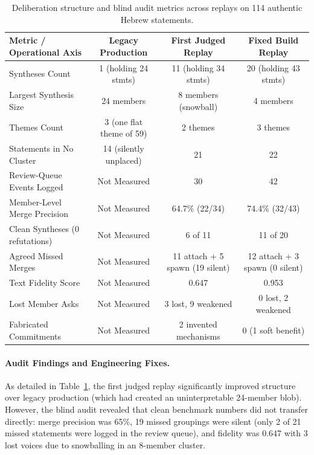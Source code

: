 \documentclass{article}
\begin{document}
\begin{table}[t]
\centering
\caption{Deliberation structure and blind audit metrics across replays on 114 authentic Hebrew statements.}
\label{tab:realdata}
\footnotesize
\begin{tabular}{@{}lccc@{}}
\toprule
Metric / Operational Axis & Legacy Production & First Judged Replay & Fixed Build Replay \\
\midrule
Syntheses Count & 1 (holding 24 stmts) & 11 (holding 34 stmts) & 20 (holding 43 stmts) \\
Largest Synthesis Size & 24 members & 8 members (snowball) & 4 members \\
Themes Count & 3 (one flat theme of 59) & 2 themes & 3 themes \\
Statements in No Cluster & 14 (silently unplaced) & 21 & 22 \\
Review-Queue Events Logged & Not Measured & 30 & 42 \\
Member-Level Merge Precision & Not Measured & 64.7\% (22/34) & 74.4\% (32/43) \\
Clean Syntheses (0 refutations) & Not Measured & 6 of 11 & 11 of 20 \\
Agreed Missed Merges & Not Measured & 11 attach + 5 spawn (19 silent) & 12 attach + 3 spawn (0 silent) \\
Text Fidelity Score & Not Measured & 0.647 & 0.953 \\
Lost Member Asks & Not Measured & 3 lost, 9 weakened & 0 lost, 2 weakened \\
Fabricated Commitments & Not Measured & 2 invented mechanisms & 0 (1 soft benefit) \\
\bottomrule
\end{tabular}
\end{table}

\paragraph{Audit Findings and Engineering Fixes.} As detailed in Table~\ref{tab:realdata}, the first judged replay significantly improved structure over legacy production (which had created an uninterpretable 24-member blob). However, the blind audit revealed that clean benchmark numbers did not transfer directly: merge precision was 65\%, 19 missed groupings were silent (only 2 of 21 missed statements were logged in the review queue), and fidelity was 0.647 with 3 lost voices due to snowballing in an 8-member cluster.
\end{document}

